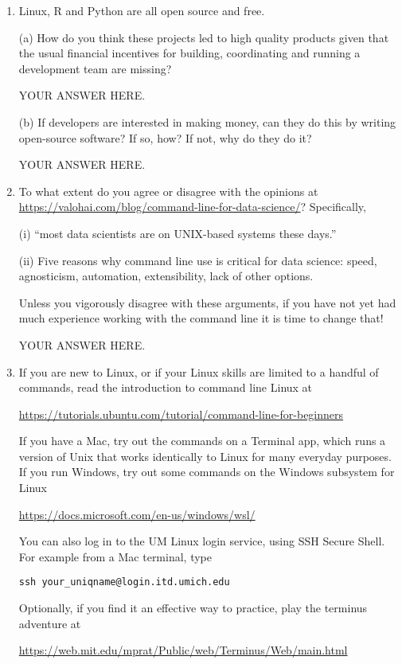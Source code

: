 \documentclass[12pt]{article}
\begin{document}
\begin{enumerate}

\item Linux, R and Python are all open source and free. 

(a) How do you think these projects led to high quality products given that the  usual financial incentives for building, coordinating and running a development team are missing?

YOUR ANSWER HERE.

(b) If developers are interested in making money, can they do this by writing open-source software? If so, how? If not, why do they do it?

YOUR ANSWER HERE.
  
\item To what extent do you agree or disagree with the opinions at
\url{https://valohai.com/blog/command-line-for-data-science/}?
Specifically,

(i) ``most data scientists are on UNIX-based systems these days.''

(ii) Five reasons why command line use is critical for data science: speed, agnosticism, automation, extensibility, lack of other options.

Unless you vigorously disagree with these arguments, if you have not yet had much experience working with the command line it is time to change that!

YOUR ANSWER HERE.

\item If you are new to Linux, or if your Linux skills are limited to a handful of commands, read the introduction to command line Linux at
  
\url{https://tutorials.ubuntu.com/tutorial/command-line-for-beginners}

If you have a Mac, try out the commands on a Terminal app, which runs a version of Unix that works identically to Linux for many everyday purposes. If you run Windows, try out some commands on the Windows subsystem for Linux

\url{https://docs.microsoft.com/en-us/windows/wsl/}

You can also log in to the UM Linux login service, using SSH Secure Shell. For example from a Mac terminal, type

\texttt{ssh your\_uniqname@login.itd.umich.edu}

Optionally, if you find it an effective way to practice, play the terminus adventure at

\url{https://web.mit.edu/mprat/Public/web/Terminus/Web/main.html}


\end{enumerate}
\end{document}
